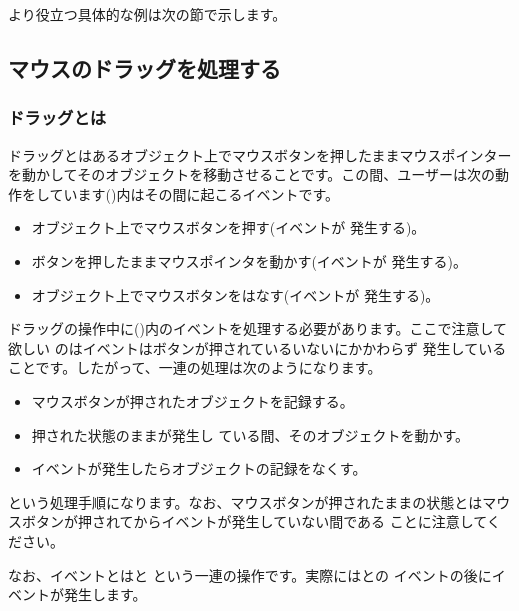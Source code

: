 より役立つ具体的な例は次の節で示します。
\fi
\subsection{マウスのドラッグを処理する}
\subsubsection{ドラッグとは}
ドラッグとはあるオブジェクト上でマウスボタンを押したままマウスポインター
を動かしてそのオブジェクトを移動させることです。この間、ユーザーは次の動
作をしています()内はその間に起こるイベントです。

\begin{itemize}
 \item オブジェクト上でマウスボタンを押す(イベントが
 発生する)。
 \item ボタンを押したままマウスポインタを動かす(イベントが
 発生する)。
 \item オブジェクト上でマウスボタンをはなす(イベントが
 発生する)。
\end{itemize}
ドラッグの操作中に()内のイベントを処理する必要があります。ここで注意して欲しい
のはイベントはボタンが押されているいないにかかわらず
発生していることです。したがって、一連の処理は次のようになります。
\begin{itemize}
 \item マウスボタンが押されたオブジェクトを記録する。
 \item 押された状態のままが発生し
ている間、そのオブジェクトを動かす。
 \item {}イベントが発生したらオブジェクトの記録をなくす。
\end{itemize}
という処理手順になります。なお、マウスボタンが押されたままの状態とはマウ
スボタンが押されてからイベントが発生していない間である
ことに注意してください。

なお、イベントとはと
という一連の操作です。実際にはとの
イベントの後にイベントが発生します。
